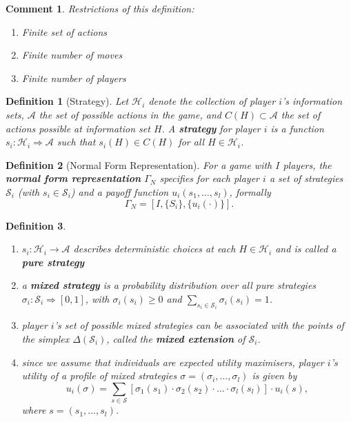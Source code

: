 \documentclass[12pt]{extreport} %
\theoremstyle{named}
\theoremstyle{itshape}
\newtheorem*{definition}{Definition}
\theoremstyle{normal}
\newtheorem*{comment*}{Comment}
\begin{document}
\begin{comment*}
	Restrictions of this definition:
	\begin{enumerate}
		\item Finite set of actions
		\item Finite number of moves
		\item Finite number 	of players
	\end{enumerate}
\end{comment*}

\begin{definition}[Strategy]
	Let $\mathcal{H}_i$ denote the collection of player $i$'s information sets, $\mathcal{A}$ the set of possible actions in the game, and $C(H) \subset \mathcal{A}$ the set of actions possible at information set $H$. A \textbf{strategy} for player $i$ is a function $s_i \colon \mathcal{H}_i \Rightarrow \mathcal{A}$ such that $s_i(H) \in C(H)$ for all $H \in \mathcal{H}_i$.
\end{definition} 

\begin{definition}[Normal Form Representation]
	For a game with $I$ players, the \textbf{normal form representation} $\Gamma_N$ specifies for each player $i$ a set of strategies $\mathcal{S}_{i}$ (with $s_i \in \mathcal{S}_i$) and a payoff function $u_i(s_1, \dotsc, s_l)$, formally 
	$$ \Gamma_N = [I, \{ S_i \}, \{ u_i(\cdot) \}]. $$
\end{definition} 

\begin{definition} ~\
	\begin{enumerate}
		\item $s_i \colon \mathcal{H}_i \rightarrow \mathcal{A}$ describes deterministic choices at each $H \in \mathcal{H}_i$ and is called a \textbf{pure strategy}
		\item a \textbf{mixed strategy} is a probability distribution over all pure strategies $\sigma_i \colon \mathcal{S}_i \Rightarrow [0, 1]$, with $\sigma_i(s_i) \geq 0$ and $\sum_{s_i \in \mathcal{S}_i} \sigma_i(s_i) = 1$.
		\item player $i$'s set of possible mixed strategies can be associated with the points of the simplex $\Delta(\mathcal{S}_i)$, called the \textbf{mixed extension} of $\mathcal{S}_i$.
		\item since we assume that individuals are expected utility maximisers, player $i$'s utility of a profile of mixed strategies $\sigma = \left( \sigma_i, \dotsc, \sigma_l \right)$ is given by
			$$ u_i(\sigma) = \sum_{s \in \mathcal{S}} [\sigma_1(s_1) \cdot \sigma_2(s_2) \cdot \dotsc \cdot \sigma_l(s_l)] \cdot u_i(s), $$
			where $s = (s_1, \dotsc, s_l)$.
	\end{enumerate}
\end{definition}
\end{document}
